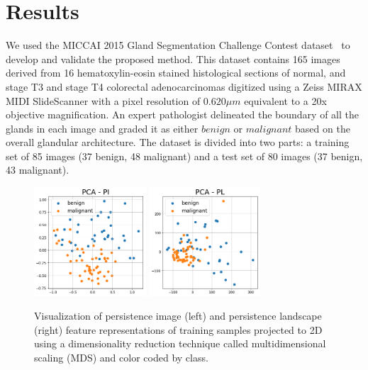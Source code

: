 \documentclass{article}
\begin{document}
\section{Results}
\label{sec:results}
We used the MICCAI 2015 Gland Segmentation Challenge Contest dataset~\cite{Sirinukunwattana2017} to develop and validate the proposed method. This dataset contains 165 images derived from 16 hematoxylin-eosin stained histological sections of normal, and stage T3 and stage T4 colorectal adenocarcinomas digitized using a Zeiss MIRAX MIDI SlideScanner with a pixel resolution of $0.620 \mu m$ equivalent to a 20x objective magnification. An expert pathologist delineated the boundary of all the glands in each image and graded it as either $benign$ or $malignant$ based on the overall glandular architecture. The dataset is divided into two parts: a training set of 85 images (37 benign, 48 malignant) and a test set of 80 images (37 benign, 43 malignant).
%
\begin{figure}[t]
\centering
\includegraphics[height=1.6in]{figures/pi_PCA.png}
\includegraphics[height=1.6in]{figures/pl_PCA.png}
\caption{Visualization of persistence image (left) and persistence landscape (right) feature representations of  training samples projected to 2D using a dimensionality reduction technique called multidimensional scaling (MDS) and color coded by class.}
\label{fig:feature_vis}
\end{figure}
%
\end{document}
